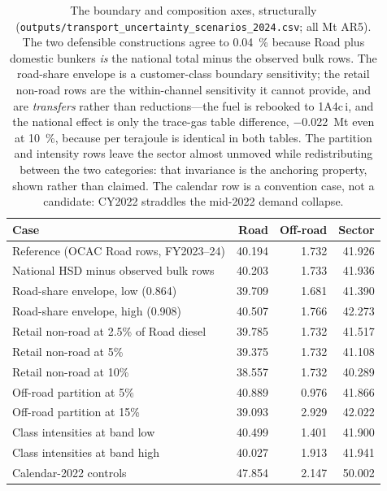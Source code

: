 \begin{table}[htbp]
\centering
\footnotesize
\begin{tabular}{@{}lrrr@{}}
\toprule
\textbf{Case} & \textbf{Road} & \textbf{Off-road} & \textbf{Sector} \\
\midrule
Reference (OCAC Road rows, FY2023--24)   & 40.194 & 1.732 & 41.926 \\
National HSD minus observed bulk rows    & 40.203 & 1.733 & 41.936 \\
Road-share envelope, low (0.864)         & 39.709 & 1.681 & 41.390 \\
Road-share envelope, high (0.908)        & 40.507 & 1.766 & 42.273 \\
Retail non-road at 2.5\% of Road diesel  & 39.785 & 1.732 & 41.517 \\
Retail non-road at 5\%                   & 39.375 & 1.732 & 41.108 \\
Retail non-road at 10\%                  & 38.557 & 1.732 & 40.289 \\
Off-road partition at 5\%                & 40.889 & 0.976 & 41.866 \\
Off-road partition at 15\%               & 39.093 & 2.929 & 42.022 \\
Class intensities at band low            & 40.499 & 1.401 & 41.900 \\
Class intensities at band high           & 40.027 & 1.913 & 41.941 \\
Calendar-2022 controls                   & 47.854 & 2.147 & 50.002 \\
\bottomrule
\end{tabular}
\caption{The boundary and composition axes, structurally
(\texttt{outputs/transport\_uncertainty\_scenarios\_2024.csv}; all Mt \COe{} AR5). The two
defensible constructions agree to \SI{0.04}{\percent} because Road plus domestic bunkers
\emph{is} the national total minus the observed bulk rows. The road-share envelope is a
customer-class boundary sensitivity; the retail non-road rows are the within-channel
sensitivity it cannot provide, and are \emph{transfers} rather than reductions---the
fuel is rebooked to 1A4c\,i, and the national effect is only the trace-gas table
difference, \SI{-0.022}{\mega\tonne} even at \SI{10}{\percent}, because \COtwo{} per
terajoule is identical in both tables. The partition and intensity rows leave the sector
almost unmoved while redistributing between the two categories: that invariance is the
anchoring property, shown rather than claimed. The calendar row is a convention case, not
a candidate: CY2022 straddles the mid-2022 demand collapse.}
\label{tab:boundary}
\end{table}

